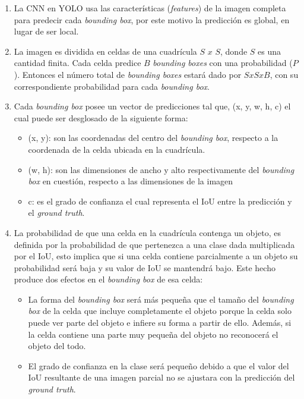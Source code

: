 \begin{enumerate}
    \item La CNN en YOLO usa las características (\textit{features}) de la imagen completa para predecir cada \textit{bounding box}, por este motivo la predicción es global, en lugar de ser local.
    \item La imagen es dividida en celdas de una cuadrícula $S$ $x$ $S$, donde $S$ es una cantidad finita. Cada celda predice $B$ \textit{bounding boxes} con una probabilidad ($P$). Entonces el número total de \textit{bounding boxes} estará dado por $S$$x$$S$$x$$B$, con su correspondiente probabilidad para cada \textit{bounding box}.
    \item Cada \textit{bounding box} posee un vector de predicciones tal que, (x, y, w, h, c) el cual puede ser desglosado de la siguiente forma:
    \begin{itemize}
        \item (x, y): son las coordenadas del centro del \textit{bounding box}, respecto a la coordenada de la celda ubicada en la cuadrícula.
        \item (w, h): son las dimensiones de ancho y alto respectivamente del \textit{bounding box} en cuestión, respecto a las dimensiones de la imagen
        \item c: es el grado de confianza el cual representa el IoU entre la predicción y el \textit{ground truth}.
    \end{itemize}
    \item La probabilidad de que una celda en la cuadrícula contenga un objeto, es definida por la probabilidad de que pertenezca a una clase dada multiplicada por el IoU, esto implica que si una celda contiene parcialmente a un objeto su probabilidad será baja y su valor de IoU se mantendrá bajo. Este hecho produce dos efectos en el \textit{bounding box} de esa celda:
    \begin{itemize}
        \item La forma del \textit{bounding box} será más pequeña que el tamaño del \textit{bounding box} de la celda que incluye completamente el objeto porque la celda solo puede ver parte del objeto e infiere su forma a partir de ello. Además, si la celda contiene una parte muy pequeña del objeto no reconocerá el objeto del todo.
        \item El grado de confianza en la clase será pequeño debido a que el valor del IoU resultante de una imagen parcial no se ajustara con la predicción del \textit{ground truth}.
    \end{itemize}

\end{enumerate}
